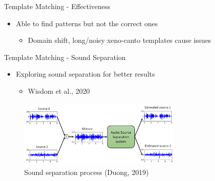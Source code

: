 \begin{frame}{Template Matching - Effectiveness}
    \begin{itemize}
        \item Able to find patterns but not the correct ones
            \begin{itemize}
                \item Domain shift, long/noisy xeno-canto templates cause issues
            \end{itemize}
    \end{itemize}
\end{frame}

\begin{frame}{Template Matching - Sound Separation}
    \begin{itemize}
        \item Exploring sound separation for better results
            \begin{itemize}
                \item Wisdom et al., 2020
            \end{itemize}
    \end{itemize}
    \begin{figure}
        \centering
        \includegraphics[height=0.7\textheight,width=0.7\textwidth,keepaspectratio]{images/sound_separation.png}
        \caption{Sound separation process (Duong, 2019)}
    \end{figure}
\end{frame}

